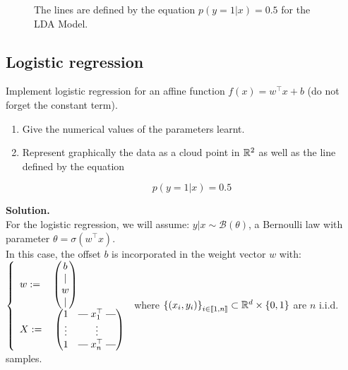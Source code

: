 \documentclass[a4paper, 11pt]{article}
\begin{document}
\begin{enumerate}[label=\alph*]
\begin{figure}[!htb]
          \label{fig:lda_c}
        \endminipage
        \vspace*{-.8cm}
        \caption{The lines are defined by the equation $p(y=1|x)=0.5$ for the LDA Model.}
        \label{fig:lda-plots}
        \end{figure}
\end{enumerate}

\subsection{Logistic regression}

Implement logistic regression for an affine function $f(x) = w^\top x + b$ (do not forget the constant term).

\begin{enumerate}[label=\alph*]
    \item Give the numerical values of the parameters learnt.
    
    \item Represent graphically the data as a cloud point in $\mathbb{R}^{2}$ as well as the line defined by the equation
    
    \begin{equation*}
        p \left( y = 1 | x \right) = 0.5
    \end{equation*}
\end{enumerate}

\textbf{Solution.} \\

For the logistic regression, we will assume: $ y|x \sim \mathcal{B}(\theta)$, a Bernoulli law with parameter $\theta = \sigma(w^\top x) $. \\ 

In this case, the offset $b$ is incorporated in the weight vector $w$ with: $
    \left\{
        \begin{array}{ll}
            w := \quad
                    \begin{pmatrix} 
                    b \\
                    | \\
                    w \\
                    |
                    \end{pmatrix} \\
            X := \quad
                    \begin{pmatrix} 
                    1 & \protect\rotvert\; x_{1}^\top \;\protect\rotvert \\
                    \vdots & \vdots \\
                    1 & \protect\rotvert\; x_{n}^\top \;\protect\rotvert
                    \end{pmatrix} \\
        \end{array}
    \right.
    $ where $\left\{ \left( x_{i}, y_{i} \right) \right\}_{i \in [\![ 1, n ]\!]} \subset \mathbb{R}^{d} \times \left\{ 0, 1 \right\}$ are $n$ i.i.d. samples.
    
\end{document}
